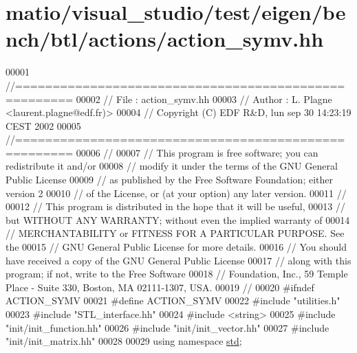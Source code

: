 \hypertarget{matio_2visual__studio_2test_2eigen_2bench_2btl_2actions_2action__symv_8hh_source}{}\section{matio/visual\+\_\+studio/test/eigen/bench/btl/actions/action\+\_\+symv.hh}
\label{matio_2visual__studio_2test_2eigen_2bench_2btl_2actions_2action__symv_8hh_source}

\begin{DoxyCode}
00001 \textcolor{comment}{//=====================================================}
00002 \textcolor{comment}{// File   :  action\_symv.hh}
00003 \textcolor{comment}{// Author :  L. Plagne <laurent.plagne@edf.fr)>}
00004 \textcolor{comment}{// Copyright (C) EDF R&D,  lun sep 30 14:23:19 CEST 2002}
00005 \textcolor{comment}{//=====================================================}
00006 \textcolor{comment}{//}
00007 \textcolor{comment}{// This program is free software; you can redistribute it and/or}
00008 \textcolor{comment}{// modify it under the terms of the GNU General Public License}
00009 \textcolor{comment}{// as published by the Free Software Foundation; either version 2}
00010 \textcolor{comment}{// of the License, or (at your option) any later version.}
00011 \textcolor{comment}{//}
00012 \textcolor{comment}{// This program is distributed in the hope that it will be useful,}
00013 \textcolor{comment}{// but WITHOUT ANY WARRANTY; without even the implied warranty of}
00014 \textcolor{comment}{// MERCHANTABILITY or FITNESS FOR A PARTICULAR PURPOSE.  See the}
00015 \textcolor{comment}{// GNU General Public License for more details.}
00016 \textcolor{comment}{// You should have received a copy of the GNU General Public License}
00017 \textcolor{comment}{// along with this program; if not, write to the Free Software}
00018 \textcolor{comment}{// Foundation, Inc., 59 Temple Place - Suite 330, Boston, MA  02111-1307, USA.}
00019 \textcolor{comment}{//}
00020 \textcolor{preprocessor}{#ifndef ACTION\_SYMV}
00021 \textcolor{preprocessor}{#define ACTION\_SYMV}
00022 \textcolor{preprocessor}{#include "utilities.h"}
00023 \textcolor{preprocessor}{#include "STL\_interface.hh"}
00024 \textcolor{preprocessor}{#include <string>}
00025 \textcolor{preprocessor}{#include "init/init\_function.hh"}
00026 \textcolor{preprocessor}{#include "init/init\_vector.hh"}
00027 \textcolor{preprocessor}{#include "init/init\_matrix.hh"}
00028 
00029 \textcolor{keyword}{using namespace }\hyperlink{namespacestd}{std};

\end{DoxyCode}
